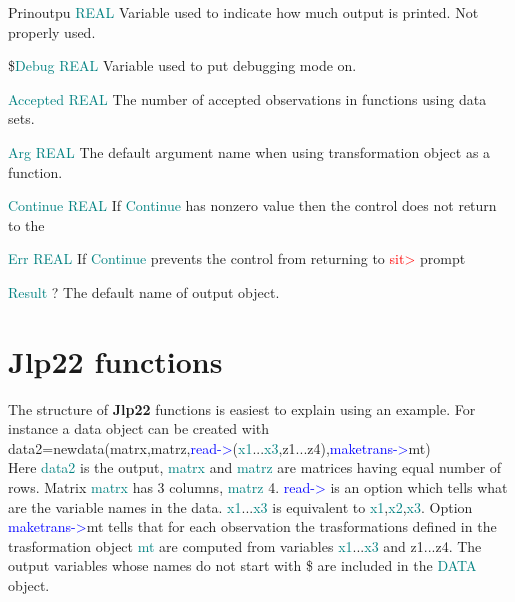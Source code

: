 {\noindent Prinoutpu \tabto{25mm }   \textcolor{teal}{REAL} \tabto{45mm }   Variable used to indicate how much output is printed. Not properly used. 
 
 
 
 
 
 
\noindent \$\textcolor{teal}{Debug} \tabto{25mm }  \textcolor{teal}{REAL} \tabto{45mm }   Variable used to put debugging mode on. 
 
 
 
 
 
 
 
 
\noindent \textcolor{teal}{Accepted}  \tabto{25mm }  \textcolor{teal}{REAL} \tabto{45mm }   The number of accepted observations in functions using data sets. 
 
 
\noindent \textcolor{teal}{Arg} \tabto{25mm }   \textcolor{teal}{REAL}  \tabto{45mm }   The default argument name when using transformation object as a function. 
 
 
 
\noindent \textcolor{teal}{Continue}  \tabto{25mm }  \textcolor{teal}{REAL} \tabto{45mm }   If \textcolor{teal}{Continue} has nonzero value then the control does not return to the 
 
 
 
\noindent \textcolor{teal}{Err} \tabto{25mm }  \textcolor{teal}{REAL} \tabto{45mm }   If \textcolor{teal}{Continue} prevents the control from returning to \textcolor{Red}{sit>} prompt 
 
 
 
 
 
 
 
\noindent \textcolor{teal}{Result} \tabto{25mm }   ?  \tabto{45mm }   The default name of output object. 
 
\section{\textbf{Jlp22} functions} 
\label{jfuncs0} 
The structure of \textbf{Jlp22} functions is easiest to explain using an example. 
For instance a data object can be created with \\ 
data2=\textcolor{VioletRed}{newdata}(matrx,matrz,\textcolor{blue}{read->}(\textcolor{teal}{x1}...\textcolor{teal}{x3},z1...z4),\textcolor{blue}{maketrans->}mt) \\ 
Here \textcolor{teal}{data2} is the output, \textcolor{teal}{matrx} and \textcolor{teal}{matrz} are matrices having equal number of rows. Matrix 
\textcolor{teal}{matrx} has 3 columns, \textcolor{teal}{matrz} 4. \textcolor{blue}{read->} is an option which tells 
what are the variable names in the data. \textcolor{teal}{x1}...\textcolor{teal}{x3} is equivalent to \textcolor{teal}{x1},\textcolor{teal}{x2},\textcolor{teal}{x3}.  Option 
\textcolor{blue}{maketrans->}mt tells that for each observation the trasformations defined in the trasformation 
object \textcolor{teal}{mt} are computed from variables \textcolor{teal}{x1}...\textcolor{teal}{x3} and z1...z4. The output variables 
whose names do not start with \$ are included in the \textcolor{teal}{DATA} object. 
 
}
